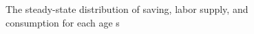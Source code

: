 \documentclass[12 pt, a4paper]{Article}
\begin{document}
\begin{figure}
\begin{center}
\end{center}
\caption{The steady-state distribution of saving, labor supply, and consumption for each age s}
\end{figure}
%
%
%
%
\end{document}
